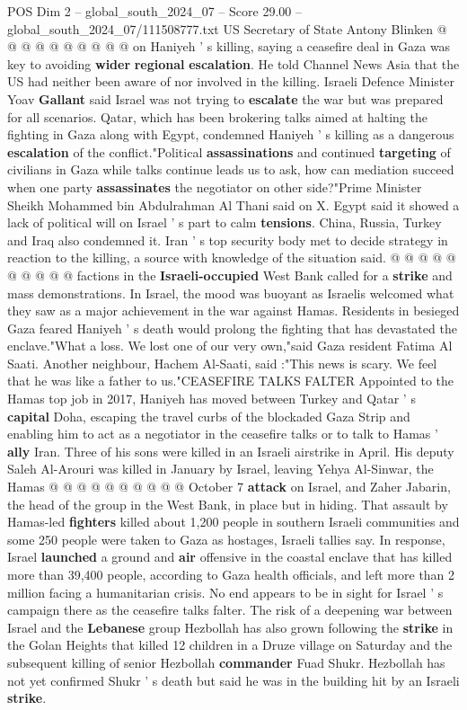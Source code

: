 \begin{textsample}{POS Dim 2 – global\_south\_2024\_07 – Score 29.00 – global\_south\_2024\_07/111508777.txt}
US Secretary of State Antony Blinken @ @ @ @ @ @ @ @ @ @ on Haniyeh ' s killing, saying a ceasefire deal in Gaza was key to avoiding \textbf{wider} \textbf{regional} \textbf{escalation}.
He told Channel News Asia that the US had neither been aware of nor involved in the killing.
Israeli Defence Minister Yoav \textbf{Gallant} said Israel was not trying to \textbf{escalate} the war but was prepared for all scenarios.
Qatar, which has been brokering talks aimed at halting the fighting in Gaza along with Egypt, condemned Haniyeh ' s killing as a dangerous \textbf{escalation} of the conflict."Political \textbf{assassinations} and continued \textbf{targeting} of civilians in Gaza while talks continue leads us to ask, how can mediation succeed when one party \textbf{assassinates} the negotiator on other side?"Prime Minister Sheikh Mohammed bin Abdulrahman Al Thani said on X.
Egypt said it showed a lack of political will on Israel ' s part to calm \textbf{tensions}.
China, Russia, Turkey and Iraq also condemned it.
Iran ' s top security body met to decide strategy in reaction to the killing, a source with knowledge of the situation said. @ @ @ @ @ @ @ @ @ @ factions in the \textbf{Israeli-occupied} West Bank called for a \textbf{strike} and mass demonstrations.
In Israel, the mood was buoyant as Israelis welcomed what they saw as a major achievement in the war against Hamas.
Residents in besieged Gaza feared Haniyeh ' s death would prolong the fighting that has devastated the enclave."What a loss.
We lost one of our very own,"said Gaza resident Fatima Al Saati.
Another neighbour, Hachem Al-Saati, said :"This news is scary.
We feel that he was like a father to us."CEASEFIRE TALKS FALTER Appointed to the Hamas top job in 2017, Haniyeh has moved between Turkey and Qatar ' s \textbf{capital} Doha, escaping the travel curbs of the blockaded Gaza Strip and enabling him to act as a negotiator in the ceasefire talks or to talk to Hamas ' \textbf{ally} Iran.
Three of his sons were killed in an Israeli airstrike in April.
His deputy Saleh Al-Arouri was killed in January by Israel, leaving Yehya Al-Sinwar, the Hamas @ @ @ @ @ @ @ @ @ @ October 7 \textbf{attack} on Israel, and Zaher Jabarin, the head of the group in the West Bank, in place but in hiding.
That assault by Hamas-led \textbf{fighters} killed about 1,200 people in southern Israeli communities and some 250 people were taken to Gaza as hostages, Israeli tallies say.
In response, Israel \textbf{launched} a ground and \textbf{air} offensive in the coastal enclave that has killed more than 39,400 people, according to Gaza health officials, and left more than 2 million facing a humanitarian crisis.
No end appears to be in sight for Israel ' s campaign there as the ceasefire talks falter.
The risk of a deepening war between Israel and the \textbf{Lebanese} group Hezbollah has also grown following the \textbf{strike} in the Golan Heights that killed 12 children in a Druze village on Saturday and the subsequent killing of senior Hezbollah \textbf{commander} Fuad Shukr.
Hezbollah has not yet confirmed Shukr ' s death but said he was in the building hit by an Israeli \textbf{strike}.


\end{textsample}

